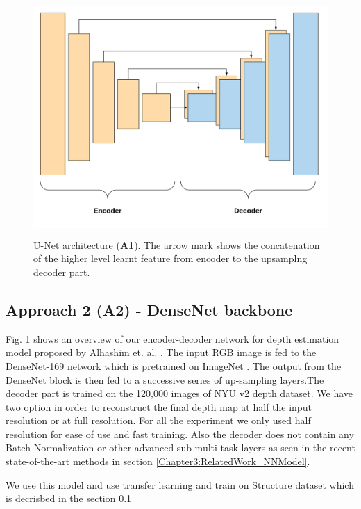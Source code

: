 \begin{figure}[t]
    \centering
    \includegraphics[width = 14cm, height = 9cm]{Figures/A1.png}
    \caption{U-Net architecture (\textbf{A1}). The arrow mark shows the concatenation of the higher level learnt feature from encoder to the upsamplng decoder part.}
    \label{fig:A1-U-NetArchetecture}
\end{figure}{}


\subsection{Approach 2 (A2) - DenseNet backbone}

Fig. \ref{fig:A1-U-NetArchetecture} shows an overview of our encoder-decoder network for depth estimation model proposed by Alhashim et. al. \cite{Alhashim2018}. The input RGB image is fed to the DenseNet-169 \cite{huang2017densely} network which is pretrained on ImageNet \cite{deng2009imagenet}. The output from the DenseNet block is then fed to a successive series of up-sampling layers.The decoder part is trained on the 120,000 images of NYU v2 depth dataset.  We have two option in order to reconstruct the final depth map at half the input resolution or at full resolution.  For all the experiment we only used half resolution for ease of use and fast training.  Also the decoder does not contain any Batch Normalization or other advanced sub multi task layers as seen in the recent state-of-the-art methods in section \ref{Chapter3:RelatedWork_NNModel}.

We use this model and use transfer learning and train on Structure dataset which is decrisbed in the section \ref{}

